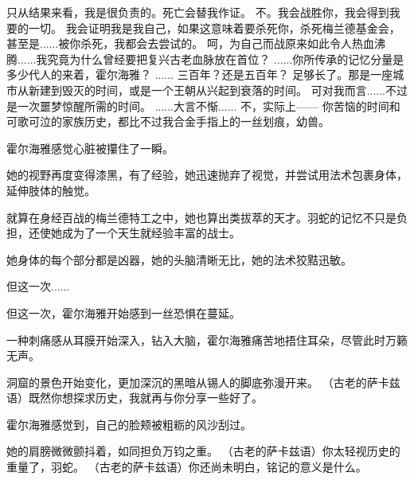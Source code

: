 \documentclass[openany]{book}
\begin{document}
\begin{dialogue}
     只从结果来看，我是很负责的。死亡会替我作证。
     不。我会战胜你，我会得到我要的一切。
     我会证明我是我自己，如果这意味着要杀死你，杀死梅兰德基金会，甚至是......被你杀死，我都会去尝试的。
     呵，为自己而战原来如此令人热血沸腾......我究竟为什么曾经要把复兴古老血脉放在首位？
     ......你所传承的记忆分量是多少代人的来着，霍尔海雅？
     ......
     三百年？还是五百年？
     足够长了。那是一座城市从新建到毁灭的时间，或是一个王朝从兴起到衰落的时间。
     可对我而言......不过是一次噩梦惊醒所需的时间。
     ......大言不惭......
     不，实际上——
     你苦恼的时间和可歌可泣的家族历史，都比不过我合金手指上的一丝划痕，幼兽。\par
    霍尔海雅感觉心脏被攥住了一瞬。\par
    她的视野再度变得漆黑，有了经验，她迅速抛弃了视觉，并尝试用法术包裹身体，延伸肢体的触觉。\par
    就算在身经百战的梅兰德特工之中，她也算出类拔萃的天才。羽蛇的记忆不只是负担，还使她成为了一个天生就经验丰富的战士。\par
    她身体的每个部分都是凶器，她的头脑清晰无比，她的法术狡黠迅敏。\par
    但这一次......\par
    但这一次，霍尔海雅开始感到一丝恐惧在蔓延。\par
    一种刺痛感从耳膜开始深入，钻入大脑，霍尔海雅痛苦地捂住耳朵，尽管此时万籁无声。\par
    洞窟的景色开始变化，更加深沉的黑暗从锡人的脚底弥漫开来。
     （古老的萨卡兹语）既然你想探求历史，我就再与你分享一些好了。\par
    霍尔海雅感觉到，自己的脸颊被粗粝的风沙刮过。\par
    她的肩膀微微颤抖着，如同担负万钧之重。
     （古老的萨卡兹语）你太轻视历史的重量了，羽蛇。
     （古老的萨卡兹语）你还尚未明白，铭记的意义是什么。
\end{dialogue}
\end{document}
